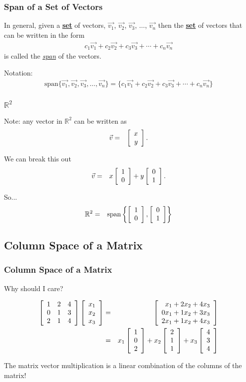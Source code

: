 \begin{frame}
  \frametitle{Span of a Set of Vectors}

  In general, given a \textbf{\underline{set}} of vectors, $\vec{v_1}$, $\vec{v_2}$, $\vec{v_3}$,
  $\ldots$, $\vec{v_n}$ then the \textbf{\underline{set}} of vectors
  that can be written in the form
  \begin{eqnarray*}
    c_1 \vec{v_1} + c_2 \vec{v_2} + c_3 \vec{v_3} + \cdots + c_n \vec{v_n}
  \end{eqnarray*}
  is called {\color{red}the \textit{\underline{span}} of the vectors.}

  {
    Notation:
    {\color{blue}
     \begin{eqnarray*}
      \mathrm{span}\{\vec{v_1}, \vec{v_2}, \vec{v_3},\ldots, \vec{v_n} \}
    = \{c_1 \vec{v_1} + c_2 \vec{v_2} + c_3 \vec{v_3} + \cdots + c_n \vec{v_n}\}
    \end{eqnarray*}
    }
  }

\end{frame}


\begin{frame}
  \frametitle{$\mathbb{R}^2$}

  Note: any vector in $\mathbb{R}^2$ can be written as 
  \begin{eqnarray*}
    \vec{v} & = & \left[ \begin{array}{r} x \\ y \end{array} \right].
  \end{eqnarray*}

  We can break this out
  \begin{eqnarray*}
    \vec{v} & = & x \left[ \begin{array}{r} 1 \\ 0 \end{array} \right] + y \left[ \begin{array}{r} 0 \\ 1 \end{array} \right].
  \end{eqnarray*}

  So... 
  \begin{eqnarray*}
    \mathbb{R}^2 & = & \mathrm{span}\left\{\left[ \begin{array}{r} 1 \\ 0 \end{array} \right],\left[ \begin{array}{r} 0 \\ 1 \end{array} \right]\right\}
  \end{eqnarray*}
 


\end{frame}


\subsection{Column Space of a Matrix}

\begin{frame}
  \frametitle{Column Space of a Matrix}

  Why should I care?

  \begin{eqnarray*}
    \left[ \begin{array}{rrr} 1 & 2 & 4 \\ 0 & 1 & 3 \\ 2 & 1 & 4 \end{array} \right] \left[ \begin{array}{r} x_1 \\ x_2 \\ x_3 \end{array} \right] &
    = & 
    \left[ \begin{array}{r} x_1+2x_2+4x_3 \\ 0x_1+1 x_2+3x_3 \\ 2x_1+1 x_2+4 x_3 \end{array} \right] \\
    & = & x_1 \left[ \begin{array}{r} 1 \\ 0 \\ 2 \end{array} \right] + x_2 \left[ \begin{array}{r} 2 \\ 1 \\ 1 \end{array} \right] + x_3 \left[ \begin{array}{r} 4 \\ 3 \\ 4 \end{array} \right]
  \end{eqnarray*}

  The matrix vector multiplication is a linear combination of the
  columns of the matrix!

\end{frame}


